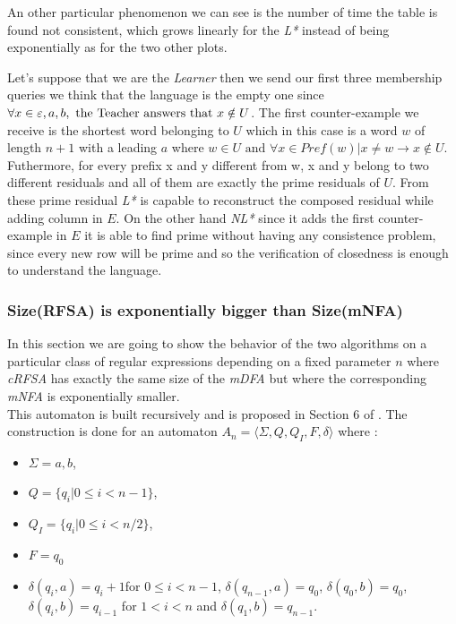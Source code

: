 An other particular phenomenon we can see is the number of time the table is found not consistent, which grows linearly for the \textit{L*} instead of being exponentially as for the two other plots.

Let's suppose that we are the \textit{Learner} then we send our first three membership queries we think that the language is the empty one since $\forall x \in{\varepsilon, a, b}, \text{ the Teacher answers that } x \notin U$. The first counter-example we receive is the shortest word belonging to $U$ which in this case is a word $w$ of length $n+1$ with a leading $a$ where $w \in U \text{ and } \forall x \in Pref(w) | x \neq w \rightarrow x \notin U$. Futhermore, for every prefix x and y different from w, x and y belong to two different residuals and all of them are exactly the prime residuals of $U$. From these prime residual \textit{L*} is capable to reconstruct the composed residual while adding column in $E$. On the other hand \textit{NL*} since it adds the first counter-example in $E$ it is able to find prime without having any consistence problem, since every new row will be prime and so the verification of closedness is enough to understand the language.

\subsubsection{Size(RFSA) is exponentially bigger than Size(mNFA)}
In this section we are going to show the behavior of the two algorithms on a particular class of regular expressions depending on a fixed parameter $n$ where \textit{cRFSA} has exactly the same size of the \textit{mDFA} but where the corresponding \textit{mNFA} is exponentially smaller.\\
This automaton is built recursively and is proposed in Section 6 of \cite{RFSA}. The construction is done for an automaton $A_n = \langle \Sigma, Q, Q_I, F, \delta \rangle $ where :
\begin{itemize}
  \item $\Sigma = {a, b}$,
  \item $Q = \{q_i | 0 \leq i < n-1 \}$,
  \item $Q_I = \{q_i | 0 \leq i < n/2\}$,
  \item $F = q_0$
  \item $\delta(q_i,a) = q_i+1$for $0 \leq i< n - 1$, $\delta(q_{n-1},a) = q_0$, $\delta(q_0,b)=q_0$, $\delta(q_i,b) = q_{i-1}$ for $1<i<n$ and $\delta(q_1,b)=q_{n-1}$.
\end{itemize}

